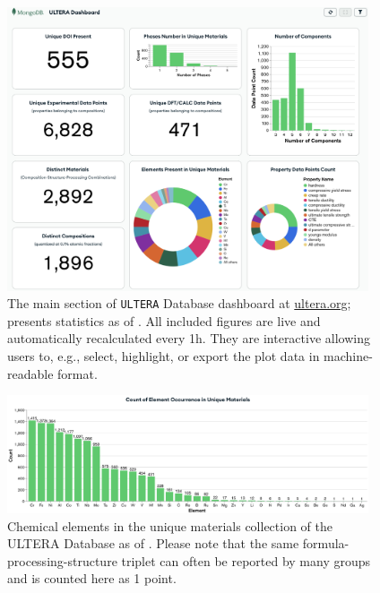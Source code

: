 \begin{figure}[H]
    \centering
    \includegraphics[width=0.95\textwidth]{ultera/ULTERA_Dashboard.png}
    \caption{The main section of \texttt{ULTERA} Database dashboard at \href{https://ultera.org}{ultera.org}; presents statistics as of \statisticstime. All included figures are live and automatically recalculated every 1h. They are interactive allowing users to, e.g., select, highlight, or export the plot data in machine-readable format.}
    \label{ultera:fig:dashboard}
\end{figure}


\begin{figure}[H]
    \centering
    \includegraphics[width=0.95\textwidth]{ultera/ultera_Chemistries.png}
    \caption{Chemical elements in the unique materials collection of the ULTERA Database as of \statisticstime. Please note that the same formula-processing-structure triplet can often be reported by many groups and is counted here as 1 point.}
    \label{ultera:fig:chemistries}
\end{figure}


